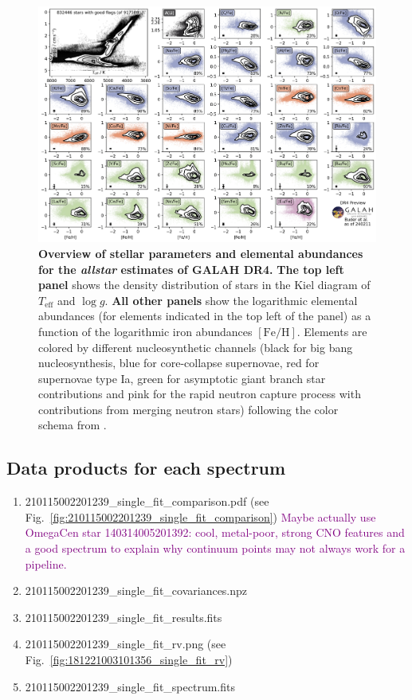 \documentclass[
  journal=pasa,
  manuscript=research-paper, %
  year=2023,
  volume=37
]{cup-journal}
\newcommand{\SB}[1]{{\textcolor{purple}{#1}}}
\newcommand{\Teff}{$T_\mathrm{eff}$\xspace}
\newcommand{\logg}{$\log g$\xspace}
\newcommand{\feh}{$\mathrm{[Fe/H]}$\xspace}
\begin{document}
\begin{landscape}
\begin{figure}
\includegraphics[width=0.975\columnwidth]{figures/galah_dr4_overview_allstar.png}
\caption{
\textbf{Overview of stellar parameters and elemental abundances for the \textit{allstar} estimates of GALAH DR4.}
\textbf{The top left panel} shows the density distribution of stars in the Kiel diagram of \Teff and \logg.
\textbf{All other panels} show the logarithmic elemental abundances (for elements indicated in the top left of the panel) as a function of the logarithmic iron abundances \feh. Elements are colored by different nucleosynthetic channels (black for big bang nucleosynthesis, blue for core-collapse supernovae, red for supernovae type Ia, green for asymptotic giant branch star contributions and pink for the rapid neutron capture process with contributions from merging neutron stars) following the color schema from \citet{Kobayashi2020}.
}
\label{fig:galah_dr4_overview_allstar}
\end{figure}
\end{landscape}


\subsection{Data products for each spectrum}
\label{sec:data_products_for_each_spectrum}

\begin{enumerate}
   \item 210115002201239\_single\_fit\_comparison.pdf (see Fig.~\ref{fig:210115002201239_single_fit_comparison}) \SB{Maybe actually use OmegaCen star 140314005201392: cool, metal-poor, strong CNO features and a good spectrum to explain why continuum points may not always work for a pipeline.}
   \item 210115002201239\_single\_fit\_covariances.npz
   \item 210115002201239\_single\_fit\_results.fits
   \item 210115002201239\_single\_fit\_rv.png (see Fig.~\ref{fig:181221003101356_single_fit_rv})
   \item 210115002201239\_single\_fit\_spectrum.fits
\end{enumerate}
\end{document}

